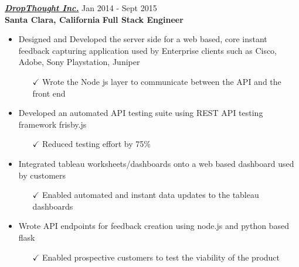 \vspace{-2pt}
{\sl \href{http://www.dropthought.com}{\textbf{DropThought Inc.}}} \hfill        Jan 2014 - Sept 2015 \\
{\textbf{Santa Clara, California}}       \hfill   \textbf{ Full Stack Engineer}

\begin{itemize} \itemsep -2pt %
 \item Designed and Developed the server side for a web based, core instant feedback capturing application used by Enterprise clients such as Cisco, Adobe, Sony Playstation, Juniper \itemsep -2pt
   \begin{itemize}
     \item[$\checkmark$]  \itemsep -8pt%
   Wrote the Node js layer to communicate between the API and the front end\\
      \end{itemize}       
\end{itemize}

\begin{itemize} \itemsep -2pt %
 \item Developed an automated API testing suite using REST API testing framework frisby.js \itemsep -2pt
   \begin{itemize}
     \item[$\checkmark$]  \itemsep -8pt%
   Reduced testing effort by 75\%\\
      \end{itemize}       
\end{itemize}

\begin{itemize} \itemsep -2pt %
 \item Integrated tableau worksheets/dashboards onto a web based dashboard used by customers \itemsep -2pt
   \begin{itemize}
     \item[$\checkmark$]  \itemsep -8pt%
   Enabled automated and instant data updates to the tableau dashboards\\
      \end{itemize}       
\end{itemize}

\begin{itemize} \itemsep -2pt %
 \item Wrote API endpoints for feedback creation using node.js and python based flask \itemsep -2pt
   \begin{itemize}
     \item[$\checkmark$]  \itemsep -8pt%
   Enabled prospective customers to test the viability of the product\\
       \end{itemize}       
\end{itemize}

